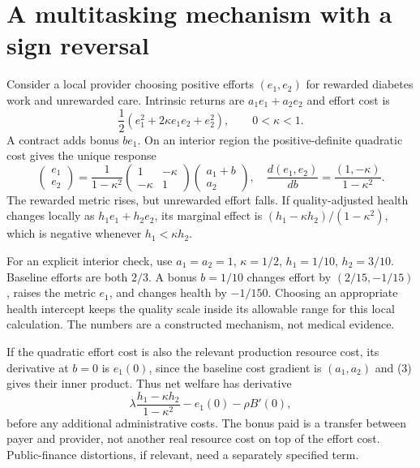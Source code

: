 \documentclass[11pt]{article}
\begin{document}
\section*{A multitasking mechanism with a sign reversal}
Consider a local provider choosing positive efforts $(e_1,e_2)$ for rewarded diabetes work and unrewarded care. Intrinsic returns are $a_1e_1+a_2e_2$ and effort cost is
\[
 \frac12(e_1^2+2\kappa e_1e_2+e_2^2),\qquad0<\kappa<1.
\]
A contract adds bonus $be_1$. On an interior region the positive-definite quadratic cost gives the unique response
\[
 \begin{pmatrix}e_1\\e_2\end{pmatrix}
 =\frac1{1-\kappa^2}
 \begin{pmatrix}1&-\kappa\\-\kappa&1\end{pmatrix}
 \begin{pmatrix}a_1+b\\a_2\end{pmatrix},
 \quad
 \frac{d(e_1,e_2)}{db}=\frac{(1,-\kappa)}{1-\kappa^2}. \tag{3}
\]
The rewarded metric rises, but unrewarded effort falls. If quality-adjusted health changes locally as $h_1e_1+h_2e_2$, its marginal effect is
$(h_1-\kappa h_2)/(1-\kappa^2)$, which is negative whenever $h_1<\kappa h_2$.

For an explicit interior check, use $a_1=a_2=1$, $\kappa=1/2$, $h_1=1/10$, $h_2=3/10$. Baseline efforts are both $2/3$. A bonus $b=1/10$ changes effort by $(2/15,-1/15)$, raises the metric $e_1$, and changes health by $-1/150$. Choosing an appropriate health intercept keeps the quality scale inside its allowable range for this local calculation. The numbers are a constructed mechanism, not medical evidence.

If the quadratic effort cost is also the relevant production resource cost, its derivative at $b=0$ is $e_1(0)$, since the baseline cost gradient is $(a_1,a_2)$ and (3) gives their inner product. Thus net welfare has derivative
\[
 \lambda\frac{h_1-\kappa h_2}{1-\kappa^2}-e_1(0)
 -\rho B'(0),
\]
before any additional administrative costs. The bonus paid is a transfer between payer and provider, not another real resource cost on top of the effort cost. Public-finance distortions, if relevant, need a separately specified term.
\end{document}
